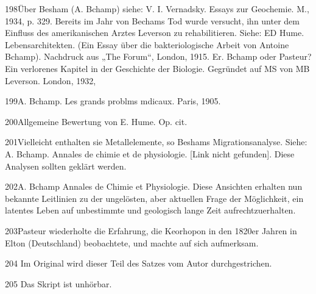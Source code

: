 \documentclass[11pt,a4paper]{book}
\begin{document}
198Über Besham (A. Bchamp) siehe: V. I. Vernadsky. Essays zur Geochemie. M., 1934, p. 329. Bereits im Jahr von Bechams Tod wurde versucht, ihn unter dem Einfluss des amerikanischen Arztes Leverson zu rehabilitieren. Siehe: ED Hume. Lebensarchitekten. (Ein Essay über die bakteriologische Arbeit von Antoine Bchamp). Nachdruck aus „The Forum“, London, 1915. Er. Bchamp oder Pasteur? Ein verlorenes Kapitel in der Geschichte der Biologie. Gegründet auf MS von MB Leverson. London, 1932,



199A. Bchamp. Les grands problms mdicaux. Paris, 1905.



200Allgemeine Bewertung von E. Hume. Op. cit.



201Vielleicht enthalten sie Metallelemente, so Beshams Migrationsanalyse. Siehe: A. Bchamp. Annales de chimie et de physiologie. [Link nicht gefunden]. Diese Analysen sollten geklärt werden.



202A. Bchamp Annales de Chimie et Physiologie. Diese Ansichten erhalten nun bekannte Leitlinien zu der ungelösten, aber aktuellen Frage der Möglichkeit, ein latentes Leben auf unbestimmte und geologisch lange Zeit aufrechtzuerhalten.



203Pasteur wiederholte die Erfahrung, die Keorhopon in den 1820er Jahren in Elton (Deutschland) beobachtete, und machte auf sich aufmerksam.



204 Im Original wird dieser Teil des Satzes vom Autor durchgestrichen.



205 Das Skript ist unhörbar.
\end{document}
